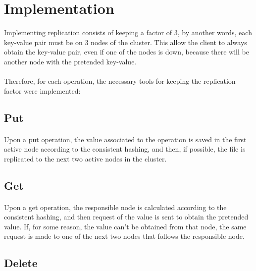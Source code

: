 \documentclass{report}
\begin{document}
			\section{Implementation}
	
				\paragraph{} Implementing replication consists of keeping a factor 
				of 3, by another words, each key-value pair must be on 3 nodes of 
				the cluster. This allow the client to always obtain the key-value 
				pair, even if one of the nodes is down, because there will be another
				node with the pretended key-value. 

				\paragraph{} Therefore, for each operation, the necessary tools for 
				keeping the replication factor were implemented:
				
				\subsection{Put}
					\paragraph{} Upon a put operation, the value associated to the
					operation is saved in the first active node according to the 
					consistent hashing, and then, if possible, the file is replicated to 
					the next two active nodes in the cluster.

				\subsection{Get}
					\paragraph{} Upon a get operation, the responsible node is calculated
					according to the consistent hashing, and then request of the value
					is sent to obtain the pretended value. If, for some reason, the 
					value can't be obtained from that node, the same request 
					is made to one of the next two nodes that follows the responsible 
					node.

				\subsection{Delete}
\end{document}

